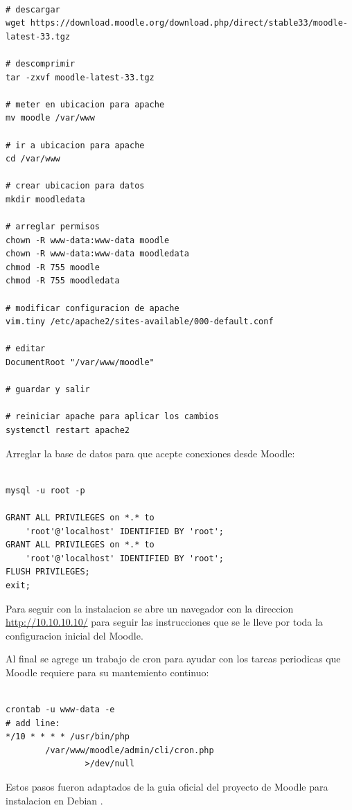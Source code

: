\begin{lstlisting}

# descargar
wget https://download.moodle.org/download.php/direct/stable33/moodle-latest-33.tgz

# descomprimir
tar -zxvf moodle-latest-33.tgz

# meter en ubicacion para apache
mv moodle /var/www

# ir a ubicacion para apache
cd /var/www

# crear ubicacion para datos
mkdir moodledata

# arreglar permisos
chown -R www-data:www-data moodle
chown -R www-data:www-data moodledata
chmod -R 755 moodle
chmod -R 755 moodledata

# modificar configuracion de apache
vim.tiny /etc/apache2/sites-available/000-default.conf

# editar
DocumentRoot "/var/www/moodle"

# guardar y salir

# reiniciar apache para aplicar los cambios
systemctl restart apache2

\end{lstlisting}

Arreglar la base de datos para que acepte conexiones desde Moodle:

\begin{lstlisting}

mysql -u root -p

GRANT ALL PRIVILEGES on *.* to
	'root'@'localhost' IDENTIFIED BY 'root';
GRANT ALL PRIVILEGES on *.* to
	'root'@'localhost' IDENTIFIED BY 'root';
FLUSH PRIVILEGES;
exit;

\end{lstlisting}

Para seguir con la instalacion se abre un navegador con la direccion \url{http://10.10.10.10/} para seguir las instrucciones que se le lleve por toda la configuracion inicial del Moodle.

Al final se agrege un trabajo de cron para ayudar con los tareas periodicas que Moodle requiere para su mantemiento continuo:

\begin{lstlisting}

crontab -u www-data -e
# add line:
*/10 * * * * /usr/bin/php
		/var/www/moodle/admin/cli/cron.php
        		>/dev/null

\end{lstlisting}

Estos pasos fueron adaptados de la guia oficial del proyecto de Moodle para instalacion en Debian \citep{MOODLE-Install-Debian}.

